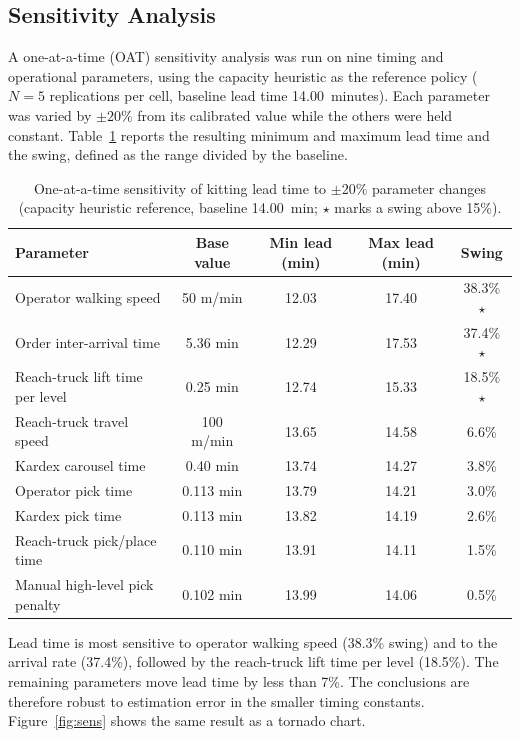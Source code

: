 \documentclass[12pt,a4paper]{article}
\begin{document}
\subsection{Sensitivity Analysis}
\label{sec:res-sens}
A one-at-a-time (OAT) sensitivity analysis was run on nine timing and
operational parameters, using the capacity heuristic as the reference policy
($N=5$ replications per cell, baseline lead time 14.00~minutes). Each
parameter was varied by $\pm20\%$ from its calibrated value while the others
were held constant. Table~\ref{tab:sens} reports the resulting minimum and
maximum lead time and the swing, defined as the range divided by the baseline.

\begin{table}[htbp]
\centering
\caption{One-at-a-time sensitivity of kitting lead time to $\pm20\%$ parameter
changes (capacity heuristic reference, baseline 14.00~min; $\star$ marks a
swing above 15\%).}
\label{tab:sens}
\begin{tabular}{lcccc}
\toprule
Parameter & Base value & Min lead (min) & Max lead (min) & Swing \\
\midrule
Operator walking speed & 50 m/min & 12.03 & 17.40 & 38.3\% $\star$ \\
Order inter-arrival time & 5.36 min & 12.29 & 17.53 & 37.4\% $\star$ \\
Reach-truck lift time per level & 0.25 min & 12.74 & 15.33 & 18.5\% $\star$ \\
Reach-truck travel speed & 100 m/min & 13.65 & 14.58 & 6.6\% \\
Kardex carousel time & 0.40 min & 13.74 & 14.27 & 3.8\% \\
Operator pick time & 0.113 min & 13.79 & 14.21 & 3.0\% \\
Kardex pick time & 0.113 min & 13.82 & 14.19 & 2.6\% \\
Reach-truck pick/place time & 0.110 min & 13.91 & 14.11 & 1.5\% \\
Manual high-level pick penalty & 0.102 min & 13.99 & 14.06 & 0.5\% \\
\bottomrule
\end{tabular}
\end{table}

Lead time is most sensitive to operator walking speed (38.3\% swing) and to
the arrival rate (37.4\%), followed by the reach-truck lift time per level
(18.5\%). The remaining parameters move lead time by less than 7\%. The
conclusions are therefore robust to estimation error in the smaller timing
constants. Figure~\ref{fig:sens} shows the same result as a tornado chart.
\end{document}
